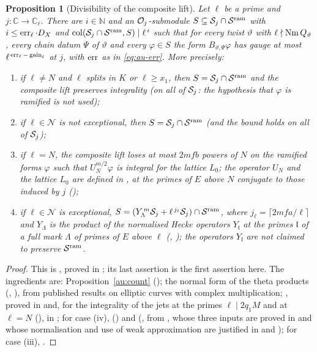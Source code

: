\documentclass[10pt]{amsart}
\newtheorem{proposition}[theorem]{Proposition}
\theoremstyle{definition}
\theoremstyle{remark}
\newcommand{\C}{\mathbb C}
\newcommand{\N}{\mathbb N}
\begin{document}
\begin{proposition}[Divisibility of the composite lift]\label{au:divis}
Let $\ell$ be a prime and $j\colon\C\to\C_\ell$. There are $i\in\N$ and an $\mathcal O_j$-submodule
$S\subseteq\mathcal S_j\cap\mathcal S^{\mathrm{ram}}$ with $i\le\operatorname{err}_\ell\cdot D_X$ and
$\operatorname{col}(\mathcal S_j\cap\mathcal S^{\mathrm{ram}},S)\mid\ell^{\,i}$ such that for every twist $\vartheta$ with
$\ell\nmid\operatorname{Nm} Q_\vartheta$, every chain datum $\Psi$ of $\vartheta$ and every $\varphi\in S$ the
form $B_{\vartheta,\Psi}\varphi$ has gauge at most $\ell^{\,\operatorname{err}_\ell-\operatorname{gain}_\ell}$ at $j$,
with $\operatorname{err}$ as in \eqref{eq:au-err}. More precisely:
\begin{enumerate}
\item[(i)] if $\ell\ne N$ and $\ell$ splits in $K$ or $\ell\ge x_1$, then $S=\mathcal S_j\cap\mathcal S^{\mathrm{ram}}$
and the composite lift preserves integrality (on all of $\mathcal S_j$: the hypothesis that $\varphi$ is
ramified is not used);
\item[(ii)] if $\ell\in\mathcal N$ is not exceptional, then $S=\mathcal S_j\cap\mathcal S^{\mathrm{ram}}$ (and the bound
holds on all of $\mathcal S_j$);
\item[(iii)] if $\ell=N$, the composite lift loses at most $2mfb$ powers of $N$ on the ramified
forms $\varphi$ such that $U_N^{m/2}\varphi$ is integral for the lattice $L_0$; the operator $U_N$
{\cite[(68)]{P49}} and the lattice $L_0$ are defined in {\cite[\S6.7]{P49}}, at the primes of $E$
above $N$ conjugate to those induced by $j$ ({\cite[Lemma~6.21]{P49}});
\item[(iv)] if $\ell\in\mathcal N$ is exceptional, $S=(Y_\Lambda^{\,m}\mathcal S_j+\ell^{\,j_\ell}\mathcal S_j)
\cap\mathcal S^{\mathrm{ram}}$, where $j_\ell=\lceil2mfa/\ell\rceil$ and $Y_\Lambda$ is the product of the normalised
Hecke operators $Y_{\mathfrak l}$ at the primes $\mathfrak l$ of a full mark $\Lambda$ of primes of
$E$ above $\ell$ ({\cite[\S4.5]{P49}}, {\cite[Theorem~4.21(iv)]{P49}}); the operators $Y_{\mathfrak l}$
are not claimed to preserve $\mathcal S^{\mathrm{ram}}$.
\end{enumerate}
\end{proposition}
\begin{proof}
This is {\cite[Theorem~4.21]{P49}}, proved in {\cite[\S4.5]{P49}}; its last assertion is the
first assertion here. The ingredients are: Proposition~\ref{au:count} ({\cite[\S4.2]{P49}}); the
normal form of the theta products ({\cite[Theorem~4.9]{P49}}, {\cite[Proposition~4.12]{P49}}), from
published results on elliptic curves with complex multiplication; {\cite[Lemma~4.13]{P49}}, proved in
{\cite[\S5.2.9]{P49}} and, for the integrality of the jets at the primes $\ell\mid2q_1M$ and at
$\ell=N$ ({\cite[Lemma~6.20]{P49}}), in {\cite[Corollary~7.16]{P49}}; for case (iv), {\cite[Lemma~4.18]{P49}}
({\cite[\S6.6]{P49}}) and {\cite[Lemma~4.19]{P49}} ({\cite[\S2.7]{P50}}, from {\cite[Theorem~2.2]{P50}}, whose
three inputs are proved in {\cite[\S3]{P50}} and whose normalisation and use of weak approximation are
justified in {\cite[Remark~6.2]{P49}} and {\cite[Corollary~6.4]{P49}}); for case (iii), {\cite[Lemma~6.21]{P49}}.
\end{proof}
\end{document}

